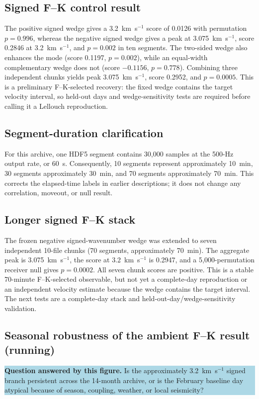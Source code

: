 \documentclass[11pt]{article}
\newcommand{\figquestion}[1]{\par\medskip\noindent\colorbox{lightblue}{\parbox{0.95\linewidth}{\textcolor{questionblue}{\textbf{Question answered by this figure.}} #1}}\par\medskip}
\begin{document}
\subsection{Signed F--K control result}
The positive signed wedge gives a 3.2~km~s$^{-1}$ score of 0.0126 with permutation $p=0.996$, whereas the negative signed wedge gives a peak at 3.075~km~s$^{-1}$, score 0.2846 at 3.2~km~s$^{-1}$, and $p=0.002$ in ten segments. The two-sided wedge also enhances the mode (score 0.1197, $p=0.002$), while an equal-width complementary wedge does not (score $-0.1156$, $p=0.778$). Combining three independent chunks yields peak 3.075~km~s$^{-1}$, score 0.2952, and $p=0.0005$. This is a preliminary F--K-selected recovery: the fixed wedge contains the target velocity interval, so held-out days and wedge-sensitivity tests are required before calling it a Lellouch reproduction.


\subsection{Segment-duration clarification}
For this archive, one HDF5 segment contains 30,000 samples at the 500-Hz output rate, or 60~s. Consequently, 10 segments represent approximately 10~min, 30 segments approximately 30~min, and 70 segments approximately 70~min. This corrects the elapsed-time labels in earlier descriptions; it does not change any correlation, moveout, or null result.


\subsection{Longer signed F--K stack}
The frozen negative signed-wavenumber wedge was extended to seven independent 10-file chunks (70 segments, approximately 70~min). The aggregate peak is 3.075~km~s$^{-1}$, the score at 3.2~km~s$^{-1}$ is 0.2947, and a 5,000-permutation receiver null gives $p=0.0002$. All seven chunk scores are positive. This is a stable 70-minute F--K-selected observable, but not yet a complete-day reproduction or an independent velocity estimate because the wedge contains the target interval. The next tests are a complete-day stack and held-out-day/wedge-sensitivity validation.


\subsection{Seasonal robustness of the ambient F--K result (running)}
\figquestion{Is the approximately 3.2~km~s$^{-1}$ signed branch persistent across the 14-month archive, or is the February baseline day atypical because of season, coupling, weather, or local seismicity?}
\end{document}
